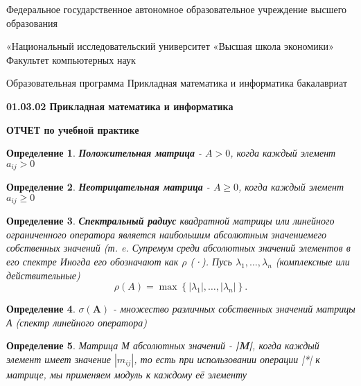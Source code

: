 \documentclass[a4paper,12pt,leqno]{article} %
\newtheorem{definition}{Определение}
\begin{document}

\begin{center}
    Федеральное государственное автономное образовательное учреждение
высшего образования

«Национальный исследовательский университет «Высшая школа экономики»
 Факультет компьютерных наук

Образовательная программа Прикладная математика и информатика
бакалавриат

\textbf{01.03.02 Прикладная математика и информатика}
\newline


\textbf{ ОТЧЕТ \newline по учебной практике}
\end{center}
  
\newpage

\begin{definition}
    \textbf{Положительная матрица} - $A > 0$, когда каждый элемент $a_{ij} > 0$
\end{definition}

\begin{definition}
    \textbf{Неотрицательная матрица} - $A \geq 0$, когда каждый элемент $a_{ij} \geq 0$
\end{definition}


\begin{definition}
    \textbf{Спектральный радиус} 
    квадратной матрицы или линейного ограниченного оператора 
    является наибольшим абсолютным значениемего собственных значений 
    (т. e. Супремум среди абсолютных значений элементов в его спектре
    Иногда его обозначают как $\rho$ (·).
    Пусь $\lambda_1, \dotsc, \lambda_n $ (комплексные или действительные)
    \[\rho(A) = \max \left \{ |\lambda_1|, \dotsc, |\lambda_n| \right \}.\]
\end{definition}

\begin{definition}
    $\sigma(\textbf{A}) $ - множество различных собственных значений 
    матрицы А (спектр линейного оператора)
\end{definition}

\begin{definition}
    Матрица М абсолютных значений - \textnormal{\textbf{|M|}}, когда каждый элемент
    имеет значение $|m_{ij}|$, то есть при использовании операции \textnormal{|*|} 
    к матрице, мы применяем модуль к каждому её элементу
\end{definition}
\end{document}
